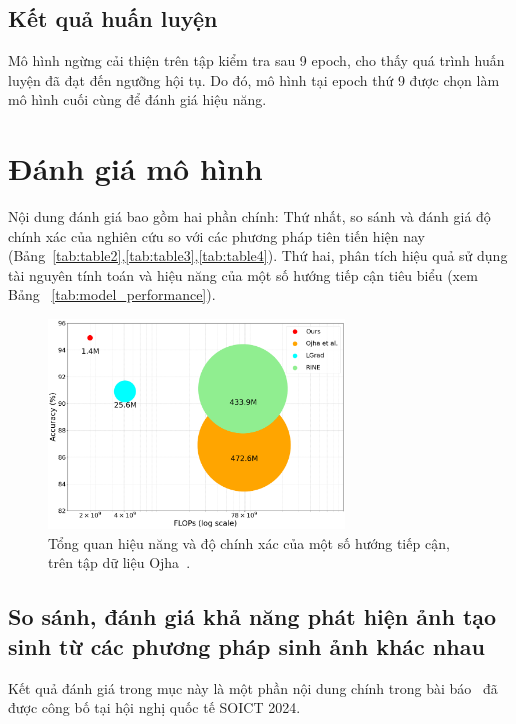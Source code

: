 \subsection{Kết quả huấn luyện}

Mô hình ngừng cải thiện trên tập kiểm tra sau 9 \gls{epoch}, cho thấy quá trình huấn luyện đã đạt đến ngưỡng hội tụ. Do đó, mô hình tại \gls{epoch} thứ 9 được chọn làm mô hình cuối cùng để đánh giá hiệu năng.



\section{Đánh giá mô hình}
%
Nội dung đánh giá bao gồm hai phần chính: Thứ nhất, so sánh và đánh giá độ chính xác của nghiên cứu so với các phương pháp tiên tiến hiện nay (Bảng~\ref{tab:table2},\ref{tab:table3},\ref{tab:table4}). Thứ hai, phân tích hiệu quả sử dụng tài nguyên tính toán và hiệu năng của một số hướng tiếp cận tiêu biểu (xem Bảng ~\ref{tab:model_performance}).
%
%
\begin{figure}[h!]
	\centering
	\includegraphics[width=0.7\textwidth]{Images/tease.png}
	\caption{Tổng quan hiệu năng và độ chính xác của một số hướng tiếp cận, trên tập dữ liệu Ojha~\cite{Ojha2023TowardsUF}.}
	\label{fig:teaser}
\end{figure}
\subsection{So sánh, đánh giá khả năng phát hiện ảnh tạo sinh từ các phương pháp sinh ảnh khác nhau}
%
Kết quả đánh giá trong mục này là một phần nội dung chính trong bài báo~\cite{adof} đã được công bố tại hội nghị quốc tế SOICT 2024.

